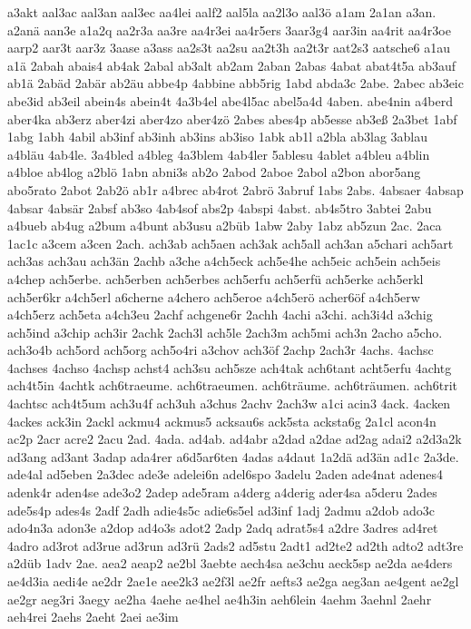 {a3akt
aal3ac
aal3an
aal3ec
aa4lei
aalf2
aal5la
aa2l3o
aal3ö
a1am
2a1an
a3an.
a2anä
aan3e
a1a2q
aa2r3a
aa3re
aa4r3ei
aa4r5ers
3aar3g4
aar3in
aa4rit
aa4r3oe
aarp2
aar3t
aar3z
3aase
a3ass
aa2s3t
aa2su
aa2t3h
aa2t3r
aat2s3
aatsche6
a1au
a1ä
2abah
abais4
ab4ak
2abal
ab3alt
ab2am
2aban
2abas
4abat
abat4t5a
ab3auf
ab1ä
2abäd
2abär
ab2äu
abbe4p
4abbine
abb5rig
1abd
abda3c
2abe.
2abec
ab3eic
abe3id
ab3eil
abein4s
abein4t
4a3b4el
abe4l5ac
abel5a4d
4aben.
abe4nin
a4berd
aber4ka
ab3erz
aber4zi
aber4zo
aber4zö
2abes
abes4p
ab5esse
ab3eß
2a3bet
1abf
1abg
1abh
4abil
ab3inf
ab3inh
ab3ins
ab3iso
1abk
ab1l
a2bla
ab3lag
3ablau
a4bläu
4ab4le.
3a4bled
a4bleg
4a3blem
4ab4ler
5ablesu
4ablet
a4bleu
a4blin
a4bloe
ab4log
a2blö
1abn
abni3s
ab2o
2abod
2aboe
2abol
a2bon
abor5ang
abo5rato
2abot
2ab2ö
ab1r
a4brec
ab4rot
2abrö
3abruf
1abs
2abs.
4absaer
4absap
4absar
4absär
2absf
ab3so
4ab4sof
abs2p
4abspi
4abst.
ab4s5tro
3abtei
2abu
a4bueb
ab4ug
a2bum
a4bunt
ab3usu
a2büb
1abw
2aby
1abz
ab5zun
2ac.
2aca
1ac1c
a3cem
a3cen
2ach.
ach3ab
ach5aen
ach3ak
ach5all
ach3an
a5chari
ach5art
ach3as
ach3au
ach3än
2achb
a3che
a4ch5eck
ach5e4he
ach5eic
ach5ein
ach5eis
a4chep
ach5erbe.
ach5erben
ach5erbes
ach5erfu
ach5erfü
ach5erke
ach5erkl
ach5er6kr
a4ch5erl
a6cherne
a4chero
ach5eroe
a4ch5erö
acher6öf
a4ch5erw
a4ch5erz
ach5eta
a4ch3eu
2achf
achgene6r
2achh
4achi
a3chi.
ach3i4d
a3chig
ach5ind
a3chip
ach3ir
2achk
2ach3l
ach5le
2ach3m
ach5mi
ach3n
2acho
a5cho.
ach3o4b
ach5ord
ach5org
ach5o4ri
a3chov
ach3öf
2achp
2ach3r
4achs.
4achsc
4achses
4achso
4achsp
achst4
ach3su
ach5sze
ach4tak
ach6tant
acht5erfu
4achtg
ach4t5in
4achtk
ach6traeume.
ach6traeumen.
ach6träume.
ach6träumen.
ach6trit
4achtsc
ach4t5um
ach3u4f
ach3uh
a3chus
2achv
2ach3w
a1ci
acin3
4ack.
4acken
4ackes
ack3in
2ackl
ackmu4
ackmus5
acksau6s
ack5sta
acksta6g
2a1cl
acon4n
ac2p
2acr
acre2
2acu
2ad.
4ada.
ad4ab.
ad4abr
a2dad
a2dae
ad2ag
adai2
a2d3a2k
ad3ang
ad3ant
3adap
ada4rer
a6d5ar6ten
4adas
a4daut
1a2dä
ad3än
ad1c
2a3de.
ade4al
ad5eben
2a3dec
ade3e
adelei6n
adel6spo
3adelu
2aden
ade4nat
adenes4
adenk4r
aden4se
ade3o2
2adep
ade5ram
a4derg
a4derig
ader4sa
a5deru
2ades
ade5s4p
ades4s
2adf
2adh
adie4s5c
adie6s5el
ad3inf
1adj
2admu
a2dob
ado3c
ado4n3a
adon3e
a2dop
ad4o3s
adot2
2adp
2adq
adrat5s4
a2dre
3adres
ad4ret
4adro
ad3rot
ad3rue
ad3run
ad3rü
2ads2
ad5stu
2adt1
ad2te2
ad2th
adto2
adt3re
a2düb
1adv
2ae.
aea2
aeap2
ae2bl
3aebte
aech4sa
ae3chu
aeck5sp
ae2da
ae4ders
ae4d3ia
aedi4e
ae2dr
2ae1e
aee2k3
ae2f3l
ae2fr
aefts3
ae2ga
aeg3an
ae4gent
ae2gl
ae2gr
aeg3ri
3aegy
ae2ha
4aehe
ae4hel
ae4h3in
aeh6lein
4aehm
3aehnl
2aehr
aeh4rei
2aehs
2aeht
2aei
ae3im
}
